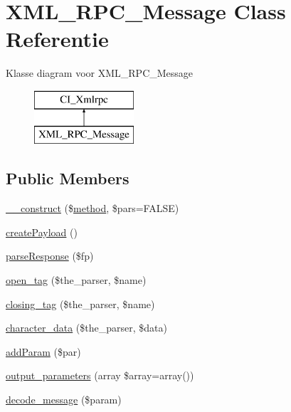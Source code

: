 \hypertarget{class_x_m_l___r_p_c___message}{}\section{X\+M\+L\+\_\+\+R\+P\+C\+\_\+\+Message Class Referentie}
\label{class_x_m_l___r_p_c___message}
Klasse diagram voor X\+M\+L\+\_\+\+R\+P\+C\+\_\+\+Message\begin{figure}[H]
\begin{center}
\leavevmode
\includegraphics[height=2.000000cm]{class_x_m_l___r_p_c___message}
\end{center}
\end{figure}
\subsection*{Public Members}
\begin{DoxyCompactItemize}
\item 
\mbox{\hyperlink{class_x_m_l___r_p_c___message_a099ea001f597681d3e5d9004923ccbcf}{\+\_\+\+\_\+construct}} (\$\mbox{\hyperlink{class_c_i___xmlrpc_a3d7e090549ec52eba8cf65598eefa72c}{method}}, \$pars=F\+A\+L\+SE)
\item 
\mbox{\hyperlink{class_x_m_l___r_p_c___message_a9db0a53d149ebbb907ef60a27bbc9f1c}{create\+Payload}} ()
\item 
\mbox{\hyperlink{class_x_m_l___r_p_c___message_ab1b93386615fce804baf236bf660a646}{parse\+Response}} (\$fp)
\item 
\mbox{\hyperlink{class_x_m_l___r_p_c___message_a7709ec5b6f0e3769592f8afdc23b9169}{open\+\_\+tag}} (\$the\+\_\+parser, \$name)
\item 
\mbox{\hyperlink{class_x_m_l___r_p_c___message_a6f0fbd9812fbf30516fa22d5743d9e89}{closing\+\_\+tag}} (\$the\+\_\+parser, \$name)
\item 
\mbox{\hyperlink{class_x_m_l___r_p_c___message_ae10d173fc93c23cb233ff01acb2afbe2}{character\+\_\+data}} (\$the\+\_\+parser, \$data)
\item 
\mbox{\hyperlink{class_x_m_l___r_p_c___message_a8000e3ae75e90052e5ee10febb9ce2d0}{add\+Param}} (\$par)
\item 
\mbox{\hyperlink{class_x_m_l___r_p_c___message_a763d97af7e5ff17493db7ecbd1064ba9}{output\+\_\+parameters}} (array \$array=array())
\item 
\mbox{\hyperlink{class_x_m_l___r_p_c___message_a76c958448d4b6569bfab9bfd2fb3dff0}{decode\+\_\+message}} (\$param)
\end{DoxyCompactItemize}
